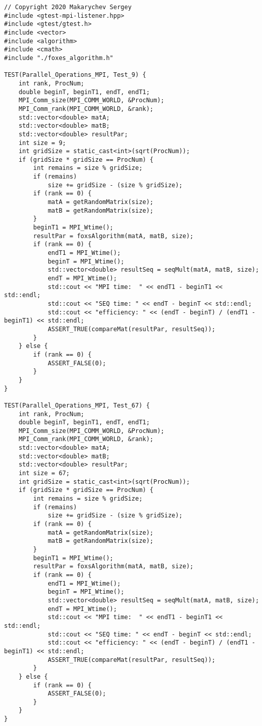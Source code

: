 \documentclass{report}
\begin{document}
\begin{lstlisting}
// Copyright 2020 Makarychev Sergey
#include <gtest-mpi-listener.hpp>
#include <gtest/gtest.h>
#include <vector>
#include <algorithm>
#include <cmath>
#include "./foxes_algorithm.h"

TEST(Parallel_Operations_MPI, Test_9) {
    int rank, ProcNum;
    double beginT, beginT1, endT, endT1;
    MPI_Comm_size(MPI_COMM_WORLD, &ProcNum);
    MPI_Comm_rank(MPI_COMM_WORLD, &rank);
    std::vector<double> matA;
    std::vector<double> matB;
    std::vector<double> resultPar;
    int size = 9;
    int gridSize = static_cast<int>(sqrt(ProcNum));
    if (gridSize * gridSize == ProcNum) {
        int remains = size % gridSize;
        if (remains)
            size += gridSize - (size % gridSize);
        if (rank == 0) {
            matA = getRandomMatrix(size);
            matB = getRandomMatrix(size);
        }
        beginT1 = MPI_Wtime();
        resultPar = foxsAlgorithm(matA, matB, size);
        if (rank == 0) {
            endT1 = MPI_Wtime();
            beginT = MPI_Wtime();
            std::vector<double> resultSeq = seqMult(matA, matB, size);
            endT = MPI_Wtime();
            std::cout << "MPI time:  " << endT1 - beginT1 << std::endl;
            std::cout << "SEQ time: " << endT - beginT << std::endl;
            std::cout << "efficiency: " << (endT - beginT) / (endT1 - beginT1) << std::endl;
            ASSERT_TRUE(compareMat(resultPar, resultSeq));
        }
    } else {
        if (rank == 0) {
            ASSERT_FALSE(0);
        }
    }
}

TEST(Parallel_Operations_MPI, Test_67) {
    int rank, ProcNum;
    double beginT, beginT1, endT, endT1;
    MPI_Comm_size(MPI_COMM_WORLD, &ProcNum);
    MPI_Comm_rank(MPI_COMM_WORLD, &rank);
    std::vector<double> matA;
    std::vector<double> matB;
    std::vector<double> resultPar;
    int size = 67;
    int gridSize = static_cast<int>(sqrt(ProcNum));
    if (gridSize * gridSize == ProcNum) {
        int remains = size % gridSize;
        if (remains)
            size += gridSize - (size % gridSize);
        if (rank == 0) {
            matA = getRandomMatrix(size);
            matB = getRandomMatrix(size);
        }
        beginT1 = MPI_Wtime();
        resultPar = foxsAlgorithm(matA, matB, size);
        if (rank == 0) {
            endT1 = MPI_Wtime();
            beginT = MPI_Wtime();
            std::vector<double> resultSeq = seqMult(matA, matB, size);
            endT = MPI_Wtime();
            std::cout << "MPI time:  " << endT1 - beginT1 << std::endl;
            std::cout << "SEQ time: " << endT - beginT << std::endl;
            std::cout << "efficiency: " << (endT - beginT) / (endT1 - beginT1) << std::endl;
            ASSERT_TRUE(compareMat(resultPar, resultSeq));
        }
    } else {
        if (rank == 0) {
            ASSERT_FALSE(0);
        }
    }
}


\end{lstlisting}
\end{document}
